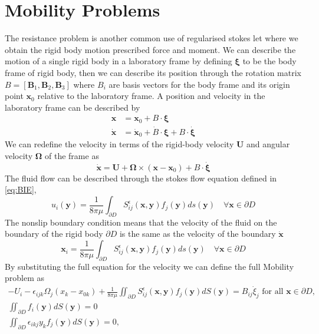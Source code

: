 \FloatBarrier
\section{Mobility Problems}
The resistance problem is another common use of regularised stokes let where we obtain the rigid body motion prescribed force and moment. We can describe the motion of a single rigid body in a laboratory frame by defining  $\bm{\xi}$ to be the body frame of rigid body, then we can describe its position through the rotation matrix $B = [\bm{B}_1,\bm{B}_2,\bm{B}_3]$ where $B_i$ are basis vectors for the body frame and its origin point $\bm{x}_0$ relative to the laboratory frame. A position and velocity in the laboratory frame can be described by
\begin{equation*}
\begin{aligned}
    \bm{x} &= \bm{x}_0 + B\cdot\bm{\xi} \\
    \dot{\bm{x}} &= \dot{\bm{x}}_0 + \dot{B}\cdot\bm{\xi} + B\cdot\dot{\bm{\xi}}
\end{aligned}
\end{equation*}
We can redefine the velocity in terms of the rigid-body velocity $\bm{U}$ and angular velocity $\bm{\Omega}$ of the frame as
\begin{equation*}
    \dot{\bm{x}} = \bm{U} + \bm{\Omega}\times (\bm{x}-\bm{x}_0) + B\cdot\dot{\bm{\xi}}
\end{equation*}
The fluid flow can be described through the stokes flow equation defined in \cref{eq:BIE},
\begin{equation*}
    u_i(\bm{y}) = \frac{1}{8 \pi \mu} \int_{\partial D} S_{i j}^{\epsilon}\left(\bm{x}, \bm{y}\right) f_{j}(\bm{y}) d s(\bm{y}) \quad \forall \bm{x}\in\partial D
\end{equation*}
The nonslip boundary condition means that the velocity of the fluid on the boundary of the rigid body $\partial D$ is the same as the velocity of the boundary $\dot{\bm{x}}$
\begin{equation*}
    \bm{x}_i = \frac{1}{8 \pi \mu} \int_{\partial D} S_{i j}^{\epsilon}\left(\bm{x}, \bm{y}\right) f_{j}(\bm{y}) d s(\bm{y}) \quad \forall \bm{x}\in\partial D
\end{equation*}
By substituting the full equation for the velocity we can define the full Mobility problem as
\begin{equation}
\label{eq:MobilityProblem}
\begin{gathered}
    -U_{i}-\epsilon_{i j k} \Omega_{j}\left(x_{k}-x_{0 k}\right)+\frac{1}{8 \pi\mu} \iint_{\partial D} S_{i j}^{\epsilon}(\bm{x}, \bm{y}) f_{j}(\bm{y}) d S({\bm{y}})=B_{i j} \dot{\xi}_{j} \text { for all } \bm{x} \in \partial D, \\
    \iint_{\partial D} f_{i}(\bm{y}) d S({\bm{y}})=0 \\
    \iint_{\partial D} \epsilon_{i k j} y_{k} f_{j}(\bm{y}) d S({\bm{y}})=0,
\end{gathered}
\end{equation}
